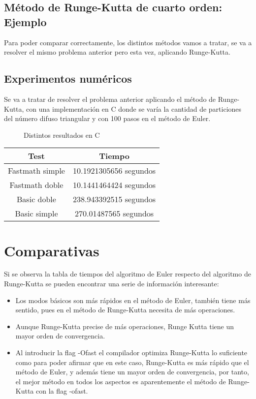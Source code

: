 \subsection{Método de Runge-Kutta de cuarto orden: Ejemplo}
Para poder comparar correctamente, los distintos métodos vamos a tratar, se va a resolver el mismo problema anterior pero esta vez, aplicando Runge-Kutta.

\subsection{Experimentos numéricos}
Se va a tratar de resolver el problema anterior aplicando el método de Runge-Kutta, con una implementación en C donde se varía la cantidad de particiones del número difuso triangular y con 100 pasos en el método de Euler.

\begin{figure}[H]
	\centering
	\caption{Distintos resultados en C}
	\label{fig:rungekuttacseq}
\end{figure}

\begin{table}[H]
	\centering
	\begin{tabular}{|c|c|}
		\hline
		\textbf{Test}  & \textbf{Tiempo}        \\ \hline
		Fastmath simple   & 10.1921305656 segundos    \\
		Fastmath doble   & 10.1441464424 segundos   \\
		Basic doble     &238.943392515 segundos    \\
	    Basic simple & 270.01487565 segundos \\ 
		\hline
	\end{tabular}%
\end{table}

\section{Comparativas}
Si se observa la tabla de tiempos del algoritmo de Euler respecto del algoritmo de Runge-Kutta se pueden encontrar una serie de información interesante:

\begin{itemize}
	\item Los modos básicos son más rápidos en el método de Euler, también tiene más sentido, pues en el método de Runge-Kutta necesita de más operaciones.
	
	\item Aunque Runge-Kutta precise de más operaciones, Runge Kutta tiene un mayor orden de convergencia.
	
	\item Al introducir la flag -Ofast el compilador optimiza Runge-Kutta lo suficiente como para poder afirmar que en este caso, Runge-Kutta es más rápido que el método de Euler, y además tiene un mayor orden de convergencia, por tanto, el mejor método en todos los aspectos es aparentemente el método de Runge-Kutta con la flag -ofast.
\end{itemize}

